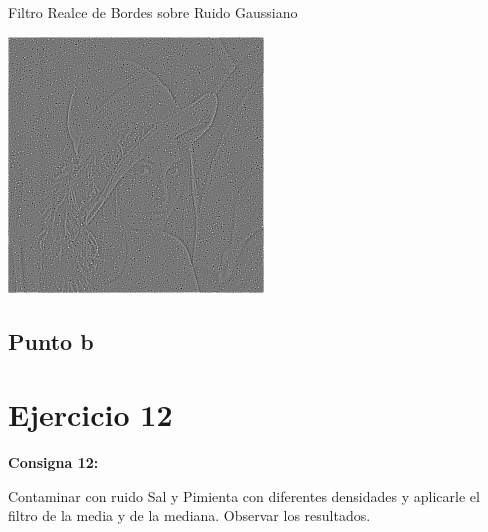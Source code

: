 \documentclass{beamer}
\begin{document}
\begin{frame}[fragile]{Filtro Realce de Bordes sobre Ruido Gaussiano}
\begin{minipage}{0.25\linewidth}
	\end{minipage}\hfill
	\begin{minipage}{0.25\linewidth}
		\centering
		\includegraphics[width=\linewidth]{../results/lena_gauss_sigma50_bordes}
	\end{minipage}
\end{frame}

\subsection{Punto b}

\section{Ejercicio 12}

\begin{frame}
	\begin{center}
		\textcolor{unahurverde}{\textbf{Consigna 12:}}
	\end{center}
	\justifying
	
	 Contaminar con ruido Sal y Pimienta con diferentes densidades y aplicarle el filtro de la media y de la mediana. Observar los resultados.
\end{frame}
\end{document}
